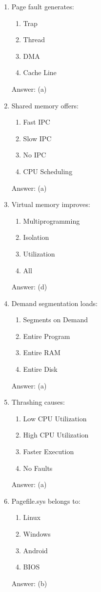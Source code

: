 \begin{enumerate}
\item Page fault generates:
\begin{enumerate}[label=(\alph*)]
\item Trap
\item Thread
\item DMA
\item Cache Line
\end{enumerate}
Answer: (a)

\item Shared memory offers:
\begin{enumerate}[label=(\alph*)]
\item Fast IPC
\item Slow IPC
\item No IPC
\item CPU Scheduling
\end{enumerate}
Answer: (a)

\item Virtual memory improves:
\begin{enumerate}[label=(\alph*)]
\item Multiprogramming
\item Isolation
\item Utilization
\item All
\end{enumerate}
Answer: (d)

\item Demand segmentation loads:
\begin{enumerate}[label=(\alph*)]
\item Segments on Demand
\item Entire Program
\item Entire RAM
\item Entire Disk
\end{enumerate}
Answer: (a)

\item Thrashing causes:
\begin{enumerate}[label=(\alph*)]
\item Low CPU Utilization
\item High CPU Utilization
\item Faster Execution
\item No Faults
\end{enumerate}
Answer: (a)

\item Pagefile.sys belongs to:
\begin{enumerate}[label=(\alph*)]
\item Linux
\item Windows
\item Android
\item BIOS
\end{enumerate}
Answer: (b)


\end{enumerate}
